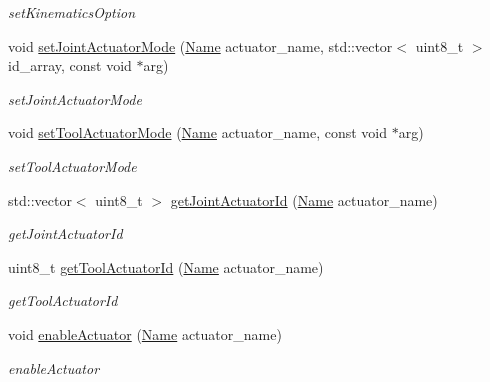 \begin{DoxyCompactItemize}
\begin{DoxyCompactList}\small\item\em set\+Kinematics\+Option \end{DoxyCompactList}\item 
void \hyperlink{classrobotis__manipulator_1_1_robotis_manipulator_a12edd33c7cbd31cb1f8d5ab2beafde71}{set\+Joint\+Actuator\+Mode} (\hyperlink{namespacerobotis__manipulator_a08c2d25e77a01ad75b9bb740f8ce4765}{Name} actuator\+\_\+name, std\+::vector$<$ uint8\+\_\+t $>$ id\+\_\+array, const void $\ast$arg)
\begin{DoxyCompactList}\small\item\em set\+Joint\+Actuator\+Mode \end{DoxyCompactList}\item 
void \hyperlink{classrobotis__manipulator_1_1_robotis_manipulator_a10f6341223566e8cc5a3b504a972b043}{set\+Tool\+Actuator\+Mode} (\hyperlink{namespacerobotis__manipulator_a08c2d25e77a01ad75b9bb740f8ce4765}{Name} actuator\+\_\+name, const void $\ast$arg)
\begin{DoxyCompactList}\small\item\em set\+Tool\+Actuator\+Mode \end{DoxyCompactList}\item 
std\+::vector$<$ uint8\+\_\+t $>$ \hyperlink{classrobotis__manipulator_1_1_robotis_manipulator_a8662851d365d64de8734a98cc873c0d7}{get\+Joint\+Actuator\+Id} (\hyperlink{namespacerobotis__manipulator_a08c2d25e77a01ad75b9bb740f8ce4765}{Name} actuator\+\_\+name)
\begin{DoxyCompactList}\small\item\em get\+Joint\+Actuator\+Id \end{DoxyCompactList}\item 
uint8\+\_\+t \hyperlink{classrobotis__manipulator_1_1_robotis_manipulator_a2ae6c2fe6b5e28a277b15b4e38764e21}{get\+Tool\+Actuator\+Id} (\hyperlink{namespacerobotis__manipulator_a08c2d25e77a01ad75b9bb740f8ce4765}{Name} actuator\+\_\+name)
\begin{DoxyCompactList}\small\item\em get\+Tool\+Actuator\+Id \end{DoxyCompactList}\item 
void \hyperlink{classrobotis__manipulator_1_1_robotis_manipulator_aa4b1b5f4c733cc21744e1c5e76ed46f9}{enable\+Actuator} (\hyperlink{namespacerobotis__manipulator_a08c2d25e77a01ad75b9bb740f8ce4765}{Name} actuator\+\_\+name)
\begin{DoxyCompactList}\small\item\em enable\+Actuator \end{DoxyCompactList}\item 

\end{DoxyCompactItemize}
